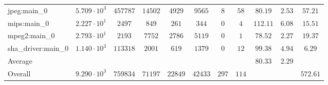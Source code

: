 \begin{tabular}{|l|c|c|c|c|c|c|c|c|c|c|}
jpeg:main\_0            & $ 5.709 \cdot 10^{3} $ & $ 457787 $ & $ 14502 $ & $ 4929  $ & $ 9565  $ & $ 8   $ & $ 58  $ & $ 80.19       $ & $ 2.53    $ & $ 57.21   $ \\
mips:main\_0            & $ 2.227 \cdot 10^{1} $ & $ 2497   $ & $ 849   $ & $ 261   $ & $ 344   $ & $ 0   $ & $ 4   $ & $ 112.11      $ & $ 6.08    $ & $ 15.51   $ \\
mpeg2:main\_0           & $ 2.793 \cdot 10^{1} $ & $ 2193   $ & $ 7752  $ & $ 2786  $ & $ 5119  $ & $ 0   $ & $ 1   $ & $ 78.52       $ & $ 2.27    $ & $ 19.37   $ \\
sha\_driver:main\_0     & $ 1.140 \cdot 10^{3} $ & $ 113318 $ & $ 2001  $ & $ 619   $ & $ 1379  $ & $ 0   $ & $ 12  $ & $ 99.38       $ & $ 4.94    $ & $ 6.29    $ \\
\hline
Average                 & $                    $ & $        $ & $       $ & $       $ & $       $ & $     $ & $     $ & $ 80.33       $ & $ 2.29    $ & $         $ \\
\hline
Overall                 & $ 9.290 \cdot 10^{3} $ & $ 759834 $ & $ 71197 $ & $ 22849 $ & $ 42433 $ & $ 297 $ & $ 114 $ & $             $ & $         $ & $ 572.61  $ \\
\hline
\end{tabular}
